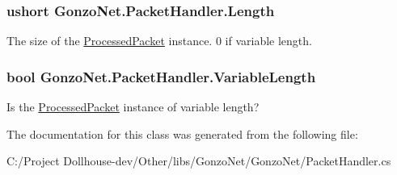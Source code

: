 \hypertarget{class_gonzo_net_1_1_packet_handler_aea1063b73fba1dda5f063d7a0ef6e3c2}{
\subsubsection[{Length}]{\setlength{\rightskip}{0pt plus 5cm}ushort Gonzo\+Net.\+Packet\+Handler.\+Length\hspace{0.3cm}{\ttfamily [get]}}}\label{class_gonzo_net_1_1_packet_handler_aea1063b73fba1dda5f063d7a0ef6e3c2}


The size of the \hyperlink{class_gonzo_net_1_1_processed_packet}{Processed\+Packet} instance. 0 if variable length. 

\hypertarget{class_gonzo_net_1_1_packet_handler_a8a43a8b52bdda7364087bea53acc2ad2}{
\subsubsection[{Variable\+Length}]{\setlength{\rightskip}{0pt plus 5cm}bool Gonzo\+Net.\+Packet\+Handler.\+Variable\+Length\hspace{0.3cm}{\ttfamily [get]}}}\label{class_gonzo_net_1_1_packet_handler_a8a43a8b52bdda7364087bea53acc2ad2}


Is the \hyperlink{class_gonzo_net_1_1_processed_packet}{Processed\+Packet} instance of variable length? 



The documentation for this class was generated from the following file\+:\begin{DoxyCompactItemize}
\item 
C\+:/\+Project Dollhouse-\/dev/\+Other/libs/\+Gonzo\+Net/\+Gonzo\+Net/Packet\+Handler.\+cs\end{DoxyCompactItemize}
